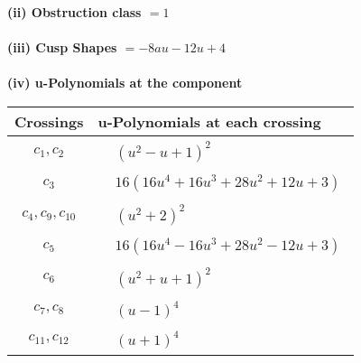 \documentclass[1p]{elsarticle_modified}
\theoremstyle{definition}
\begin{document}
\flushleft \textbf{(ii) Obstruction class $= 1$}\\~\\
\flushleft \textbf{(iii) Cusp Shapes $= -8 a u-12 u+4$}\\~\\
\newpage\renewcommand{\arraystretch}{1}
\flushleft \textbf{(iv) u-Polynomials at the component}\newline \\
\begin{tabular}{m{50pt}|m{274pt}}
Crossings & \hspace{64pt}u-Polynomials at each crossing \\
\hline $$\begin{aligned}c_{1},c_{2}\end{aligned}$$&$\begin{aligned}
&(u^2- u+1)^2
\end{aligned}$\\
\hline $$\begin{aligned}c_{3}\end{aligned}$$&$\begin{aligned}
&16(16 u^4+16 u^3+28 u^2+12 u+3)
\end{aligned}$\\
\hline $$\begin{aligned}c_{4},c_{9},c_{10}\end{aligned}$$&$\begin{aligned}
&(u^2+2)^2
\end{aligned}$\\
\hline $$\begin{aligned}c_{5}\end{aligned}$$&$\begin{aligned}
&16(16 u^4-16 u^3+28 u^2-12 u+3)
\end{aligned}$\\
\hline $$\begin{aligned}c_{6}\end{aligned}$$&$\begin{aligned}
&(u^2+u+1)^2
\end{aligned}$\\
\hline $$\begin{aligned}c_{7},c_{8}\end{aligned}$$&$\begin{aligned}
&(u-1)^4
\end{aligned}$\\
\hline $$\begin{aligned}c_{11},c_{12}\end{aligned}$$&$\begin{aligned}
&(u+1)^4
\end{aligned}$\\
\hline
\end{tabular}\\~\\
\end{document}
